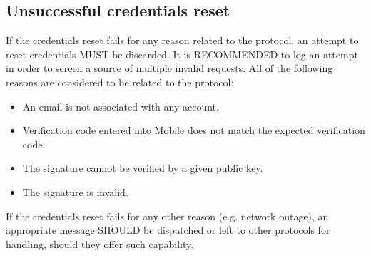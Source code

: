     \subsection{Unsuccessful credentials reset}
    If the credentials reset fails for any reason related to the protocol, an attempt to reset credentials MUST 
    be discarded. It is RECOMMENDED to log an attempt in order to screen a source of multiple invalid requests. 
    All of the following reasons are considered to be related to the protocol:
        \begin{itemize}
            \item An email is not associated with any account.
            \item Verification code entered into Mobile does not match the expected verification code.
            \item The signature cannot be verified by a given public key.
            \item The signature is invalid.
        \end{itemize}
    If the credentials reset fails for any other reason (e.g. network outage), an appropriate message SHOULD be 
    dispatched or left to other protocols for handling, should they offer such capability.
